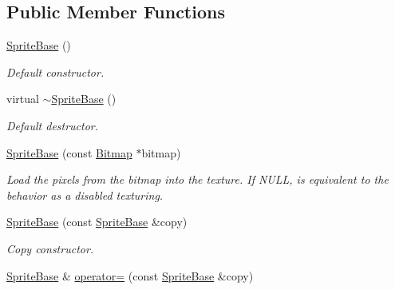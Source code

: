 \subsection*{Public Member Functions}
\begin{DoxyCompactItemize}
\item 
\hypertarget{class_f2_c_1_1_sprite_base_afbb00eac253f057d3ad63a2ac5cec749}{
\hyperlink{class_f2_c_1_1_sprite_base_afbb00eac253f057d3ad63a2ac5cec749}{SpriteBase} ()}
\label{class_f2_c_1_1_sprite_base_afbb00eac253f057d3ad63a2ac5cec749}

\begin{DoxyCompactList}\small\item\em Default constructor. \item\end{DoxyCompactList}\item 
\hypertarget{class_f2_c_1_1_sprite_base_a283941cc4bae11af8819212baedbc73d}{
virtual \hyperlink{class_f2_c_1_1_sprite_base_a283941cc4bae11af8819212baedbc73d}{$\sim$SpriteBase} ()}
\label{class_f2_c_1_1_sprite_base_a283941cc4bae11af8819212baedbc73d}

\begin{DoxyCompactList}\small\item\em Default destructor. \item\end{DoxyCompactList}\item 
\hyperlink{class_f2_c_1_1_sprite_base_aa00534841b3adc48e992e2282ec6963f}{SpriteBase} (const \hyperlink{class_f2_c_1_1_bitmap}{Bitmap} $\ast$bitmap)
\begin{DoxyCompactList}\small\item\em Load the pixels from the bitmap into the texture. If NULL, is equivalent to the behavior as a disabled texturing. \item\end{DoxyCompactList}\item 
\hypertarget{class_f2_c_1_1_sprite_base_a67e2731423751d23e05db92457ab7afe}{
\hyperlink{class_f2_c_1_1_sprite_base_a67e2731423751d23e05db92457ab7afe}{SpriteBase} (const \hyperlink{class_f2_c_1_1_sprite_base}{SpriteBase} \&copy)}
\label{class_f2_c_1_1_sprite_base_a67e2731423751d23e05db92457ab7afe}

\begin{DoxyCompactList}\small\item\em Copy constructor. \item\end{DoxyCompactList}\item 
\hypertarget{class_f2_c_1_1_sprite_base_af56c5ea473d444f4c8b65bd51d7fd724}{
\hyperlink{class_f2_c_1_1_sprite_base}{SpriteBase} \& \hyperlink{class_f2_c_1_1_sprite_base_af56c5ea473d444f4c8b65bd51d7fd724}{operator=} (const \hyperlink{class_f2_c_1_1_sprite_base}{SpriteBase} \&copy)}
\label{class_f2_c_1_1_sprite_base_af56c5ea473d444f4c8b65bd51d7fd724}


\end{DoxyCompactItemize}
